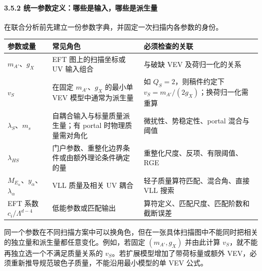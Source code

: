 \documentclass[
  chinese,
  UTF8]{ctexart}
\newcounter{none} %
\begin{document}
\paragraph{3.5.2
统一参数定义：哪些是输入，哪些是派生量}\label{ux7edfux4e00ux53c2ux6570ux5b9aux4e49ux54eaux4e9bux662fux8f93ux5165ux54eaux4e9bux662fux6d3eux751fux91cf}

在联合分析前先建立一份参数字典，并固定一次扫描内各参数的身份。

{\def\LTcaptype{none} %
\begin{longtable}[]{@{}
  >{\raggedright\arraybackslash}p{}
  >{\raggedright\arraybackslash}p{}
  >{\raggedright\arraybackslash}p{}@{}}
\toprule\noalign{}
\begin{minipage}[b]{\linewidth}\raggedright
参数或量
\end{minipage} & \begin{minipage}[b]{\linewidth}\raggedright
常见角色
\end{minipage} & \begin{minipage}[b]{\linewidth}\raggedright
必须检查的关联
\end{minipage} \\
\midrule\noalign{}
\endhead
\bottomrule\noalign{}
\endlastfoot
\(m_{A'}\)、\(g_X\) & EFT 图上的扫描坐标或 UV 输入组合 & 与破缺 VEV
及荷归一化的关系 \\
\(v_S\) & 在固定 \(m_{A'}\)、\(g_X\) 的最小单 VEV 模型中通常为派生量 &
如 \(Q_S=2\)，则稿件约定下 \(v_S=m_{A'}/(2g_X)\)；换荷归一化需重算 \\
\(\lambda_S\)、\(m_s\) & 自耦合输入与标量质量派生量；有 portal
时物理质量需对角化 & 微扰性、势稳定性、portal 混合与阈值 \\
\(\lambda_{HS}\) & 门户参数、重整化边界条件或由额外理论条件确定的量 &
重整化尺度、反项、有限阈值、RGE \\
\(M_{E_\alpha}\)、\(y_\alpha\)、\(\lambda_\alpha\) & VLL 质量及相关 UV
耦合 & 轻子质量算符匹配、混合角、直接 VLL 搜索 \\
EFT 系数 \(c_i/\Lambda^{d-4}\) & 低能参数或匹配输出 &
算符定义、匹配尺度、匹配阶数和截断误差 \\
\end{longtable}
}

同一个参数在不同扫描方案中可以换角色，但在一张具体扫描图中不能同时把相关的独立量和派生量都任意变化。例如，若固定
\((m_{A'},g_X)\) 并由此计算 \(v_S\)，就不能再独立选一个不满足质量关系的
\(v_S\)。若扩展模型增加了带荷标量或额外
VEV，必须重新推导规范玻色子质量，不能沿用最小模型的单 VEV 公式。
\end{document}

